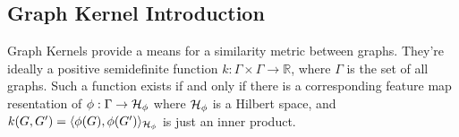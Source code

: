 




  
  
  



\subsection{Graph Kernel Introduction}
Graph Kernels provide a means for a similarity metric between graphs. They're ideally a positive semidefinite function $k: \Gamma \times \Gamma \rightarrow \mathbb{R}$, where $\Gamma$ is the set of all graphs. Such a function exists if and only if there is a corresponding feature map resentation of $\phi: \Gamma \to \mathcal{H}_\phi$ where $\mathcal{H}_\phi$ is a Hilbert space, and $k(G, G') = \langle \phi(G), \phi(G') \rangle_{\mathcal{H}_\phi}$ is just an inner product.

